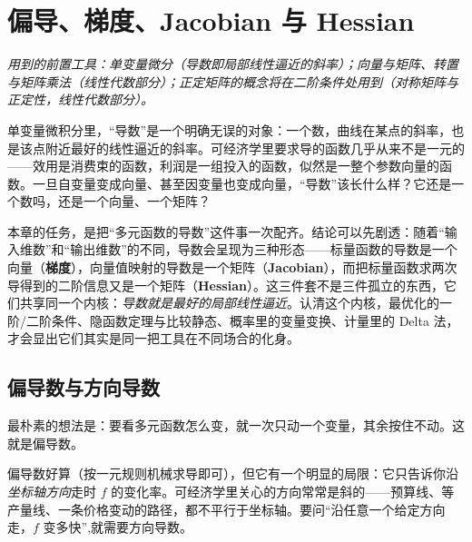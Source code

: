 \chapter{偏导、梯度、Jacobian 与 Hessian}
\label{ch:multideriv}

\noindent\emph{用到的前置工具：单变量微分（导数即局部线性逼近的斜率）；向量与矩阵、转置与矩阵乘法（线性代数部分）；正定矩阵的概念将在二阶条件处用到（对称矩阵与正定性，线性代数部分）。}
\medskip

单变量微积分里，``导数''是一个明确无误的对象：一个数，曲线在某点的斜率，也是该点附近最好的线性逼近的斜率。可经济学里要求导的函数几乎从来不是一元的——效用是消费束的函数，利润是一组投入的函数，似然是一整个参数向量的函数。一旦自变量变成向量、甚至因变量也变成向量，``导数''该长什么样？它还是一个数吗，还是一个向量、一个矩阵？

本章的任务，是把``多元函数的导数''这件事一次配齐。结论可以先剧透：随着``输入维数''和``输出维数''的不同，导数会呈现为三种形态——标量函数的导数是一个向量（\textbf{梯度}），向量值映射的导数是一个矩阵（\textbf{Jacobian}），而把标量函数求两次导得到的二阶信息又是一个矩阵（\textbf{Hessian}）。这三件套不是三件孤立的东西，它们共享同一个内核：\emph{导数就是最好的局部线性逼近}。认清这个内核，最优化的一阶/二阶条件、隐函数定理与比较静态、概率里的变量变换、计量里的 Delta 法，才会显出它们其实是同一把工具在不同场合的化身。

\section{偏导数与方向导数}
\label{sec:multideriv-1}

最朴素的想法是：要看多元函数怎么变，就一次只动一个变量，其余按住不动。这就是偏导数。


偏导数好算（按一元规则机械求导即可），但它有一个明显的局限：它只告诉你沿\emph{坐标轴方向}走时 $f$ 的变化率。可经济学里关心的方向常常是斜的——预算线、等产量线、一条价格变动的路径，都不平行于坐标轴。要问``沿任意一个给定方向走，$f$ 变多快'',就需要方向导数。


